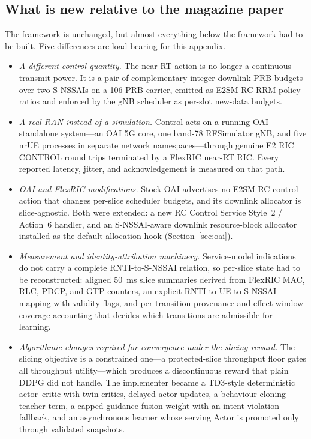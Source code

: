 \subsection{What is new relative to the magazine paper}
The framework is unchanged, but almost everything below the framework had to be built. Five differences are load-bearing for this appendix.
\begin{itemize}
  \item \emph{A different control quantity.} The near-RT action is no longer a continuous transmit power. It is a pair of complementary integer downlink PRB budgets over two S-NSSAIs on a 106-PRB carrier, emitted as E2SM-RC RRM policy ratios and enforced by the gNB scheduler as per-slot new-data budgets.
  \item \emph{A real RAN instead of a simulation.} Control acts on a running OAI standalone system---an OAI 5G core, one band-78 RFSimulator gNB, and five nrUE processes in separate network namespaces---through genuine E2 RIC CONTROL round trips terminated by a FlexRIC near-RT RIC. Every reported latency, jitter, and acknowledgement is measured on that path.
  \item \emph{OAI and FlexRIC modifications.} Stock OAI advertises no E2SM-RC control action that changes per-slice scheduler budgets, and its downlink allocator is slice-agnostic. Both were extended: a new RC Control Service Style~2 / Action~6 handler, and an S-NSSAI-aware downlink resource-block allocator installed as the default allocation hook (Section~\ref{sec:oai}).
  \item \emph{Measurement and identity-attribution machinery.} Service-model indications do not carry a complete RNTI-to-S-NSSAI relation, so per-slice state had to be reconstructed: aligned 50~ms slice summaries derived from FlexRIC MAC, RLC, PDCP, and GTP counters, an explicit RNTI-to-UE-to-S-NSSAI mapping with validity flags, and per-transition provenance and effect-window coverage accounting that decides which transitions are admissible for learning.
  \item \emph{Algorithmic changes required for convergence under the slicing reward.} The slicing objective is a constrained one---a protected-slice throughput floor gates all throughput utility---which produces a discontinuous reward that plain DDPG did not handle. The implementer became a TD3-style deterministic actor--critic with twin critics, delayed actor updates, a behaviour-cloning teacher term, a capped guidance-fusion weight with an intent-violation fallback, and an asynchronous learner whose serving Actor is promoted only through validated snapshots.
\end{itemize}

